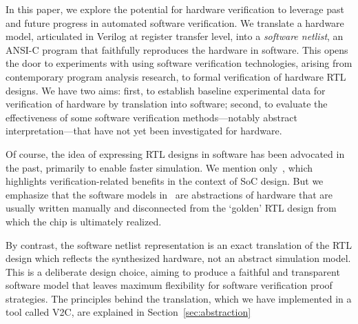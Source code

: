 In this paper, we explore the potential for hardware verification to leverage past and future progress in automated software verification. We translate a hardware model, articulated in Verilog at register transfer level, into a \emph{software netlist}, an ANSI-C program that faithfully reproduces the hardware in software. This opens the door to experiments with using software verification technologies, arising from contemporary program analysis research, to formal verification of hardware RTL designs. We have two aims: first, to establish baseline experimental data for verification of hardware by translation into software; second, to evaluate the effectiveness of some software verification methods---notably abstract interpretation---that have not yet been investigated for hardware.   

Of course, the idea of expressing RTL designs in software has been  advocated in the past, primarily to enable faster simulation. We mention only~\cite{soc-keating}, which highlights verification-related benefits in the context of SoC design.  But we emphasize that the software models in~\cite{soc-keating} are abstractions of hardware that are usually written manually and disconnected from the `golden' RTL design  from which the chip is ultimately realized.  

By contrast, the software netlist representation is an exact translation of the RTL design which reflects the synthesized hardware, not an abstract simulation model.  This is a deliberate design choice, aiming to produce a faithful and transparent software model that leaves maximum flexibility for software verification proof strategies. The principles behind the translation, which we have implemented in a tool called \textsc{V2C}, are explained in Section~\ref{sec:abstraction}

